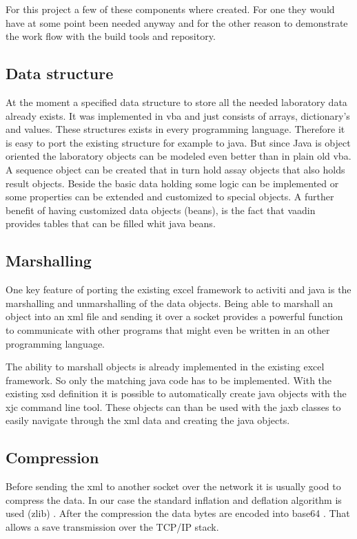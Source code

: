 \documentclass[paper=a4,twoside=false,BCOR=0mm,DIV=calc,fontsize=12pt]{scrartcl}
\begin{document}
For this project a few of these components where created. For one they would have at some point been needed anyway and for the other reason to
demonstrate the work flow with the build tools and repository.





\subsection{Data structure}
At the moment a specified data structure to store all the needed laboratory data already exists. It was implemented in vba and just consists of
arrays, dictionary's and values. These structures exists in every programming language. Therefore it is easy to port the existing structure for
example to java. But since Java is object oriented the laboratory objects can be modeled even better than in plain old vba. A sequence object can be
created that in turn hold assay objects that also holds result objects. Beside the basic data holding some logic can be implemented or some properties
can be extended and customized to special objects. A further benefit of having customized data objects (beans), is the fact that vaadin provides
tables that can be filled whit java beans.




\subsection{Marshalling}
One key feature of porting the existing excel framework to activiti and java is the marshalling and unmarshalling of the data objects.
Being able to marshall an object into an xml file and sending it over a socket provides a powerful function to communicate with other programs that
might even be written in an other programming language.

The ability to marshall objects is already implemented in the existing excel framework. So only the matching java code has to be implemented.
With the existing xsd definition it is possible to automatically create java objects with the xjc \cite{xjc} command line tool.
These objects can than be used with the jaxb classes to easily navigate through the xml data and creating the java objects.



\subsection{Compression}
Before sending the xml to another socket over the network it is usually good to compress the data.
In our case the standard inflation and deflation algorithm is used (zlib) \cite{zlib}. After the compression 
the data bytes are encoded into base64 \cite{base64}. That allows a save transmission over the TCP/IP stack.
\end{document}
